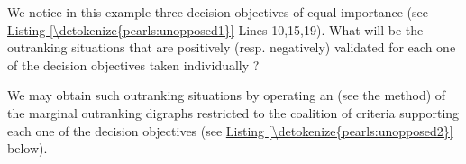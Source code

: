 \documentclass[a4paper,12pt,english]{sphinxhowto}
\begin{document}
\sphinxAtStartPar
We notice in this example three decision objectives of equal importance (see \hyperref[\detokenize{pearls:unopposed1}]{Listing \ref{\detokenize{pearls:unopposed1}}} Lines 10,15,19). What will be the outranking situations that are positively (resp.  negatively) validated for each one of the decision objectives taken individually ?

\sphinxAtStartPar
We may obtain such  outranking situations by operating an  (see the  method) of the marginal outranking digraphs restricted to the coalition of criteria supporting each one of the decision objectives (see \hyperref[\detokenize{pearls:unopposed2}]{Listing \ref{\detokenize{pearls:unopposed2}}} below).
\def\sphinxLiteralBlockLabel{\label{\detokenize{pearls:unopposed2}}}
%
\end{document}
